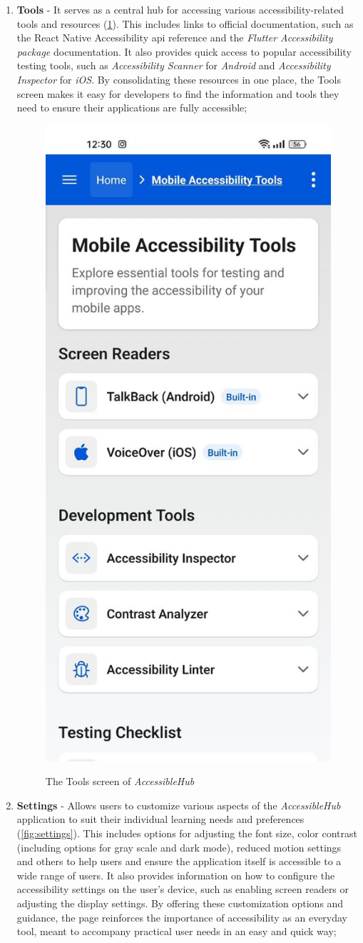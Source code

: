 \begin{enumerate}
\pagebreak

\item \textbf{Tools} - It serves as a central hub for accessing various accessibility-related tools and resources (\ref{fig:tools}). This includes links to official documentation, such as the React Native Accessibility \acrshort{api} reference and the \textit{Flutter Accessibility package} documentation. It also provides quick access to popular accessibility testing tools, such as \textit{Accessibility Scanner} for \textit{Android} and \textit{Accessibility Inspector} for \textit{iOS}. By consolidating these resources in one place, the Tools screen makes it easy for developers to find the information and tools they need to ensure their applications are fully accessible; 

\begin{figure}[ht]
\centering
\includegraphics[width=0.4\linewidth, alt={Screenshot of the Tools screen of AccessibleHub}]{img/tools.jpg}
\caption{The Tools screen of \textit{AccessibleHub}}\label{fig:tools}
\end{figure}

\pagebreak

\item \textbf{Settings} - Allows users to customize various aspects of the \textit{AccessibleHub} application to suit their individual learning needs and preferences (\ref{fig:settings}). This includes options for adjusting the font size, color contrast (including options for gray scale and dark mode), reduced motion settings and others to help users and ensure the application itself is accessible to a wide range of users. It also provides information on how to configure the accessibility settings on the user's device, such as enabling screen readers or adjusting the display settings. By offering these customization options and guidance, the page reinforces the importance of accessibility as an everyday tool, meant to accompany practical user needs in an easy and quick way;


\end{enumerate}
